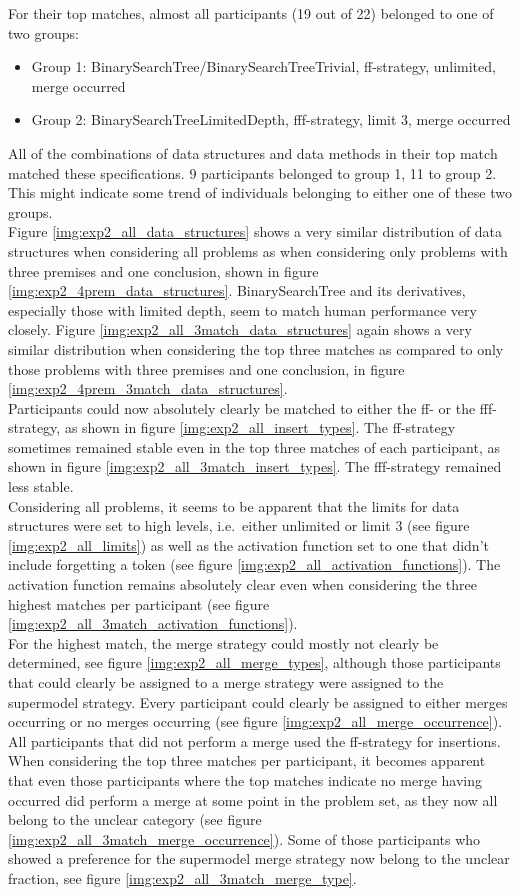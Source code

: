 \documentclass[hidelinks]{scrartcl}
\begin{document}
For their top matches, almost all participants (19 out of 22) belonged to one of two groups: 
\begin{itemize}
	\item Group 1: BinarySearchTree/BinarySearchTreeTrivial, ff-strategy, unlimited, merge occurred
	\item Group 2: BinarySearchTreeLimitedDepth, fff-strategy, limit 3, merge occurred
\end{itemize}
All of the combinations of data structures and data methods in their top match matched these specifications. 9 participants belonged to group 1, 11 to group 2. This might indicate some trend of individuals belonging to either one of these two groups. \\
Figure \ref{img:exp2_all_data_structures} shows a very similar distribution of data structures when considering all problems as when considering only problems with three premises and one conclusion, shown in figure \ref{img:exp2_4prem_data_structures}. BinarySearchTree and its derivatives, especially those with limited depth, seem to match human performance very closely. Figure \ref{img:exp2_all_3match_data_structures} again shows a very similar distribution when considering the top three matches as compared to only those problems with three premises and one conclusion, in figure \ref{img:exp2_4prem_3match_data_structures}. \\
Participants could now absolutely clearly be matched to either the ff- or the fff-strategy, as shown in figure \ref{img:exp2_all_insert_types}. The ff-strategy sometimes remained stable even in the top three matches of each participant, as shown in figure \ref{img:exp2_all_3match_insert_types}. The fff-strategy remained less stable. \\
Considering all problems, it seems to be apparent that the limits for data structures were set to high levels, i.e.\ either unlimited or limit 3 (see figure \ref{img:exp2_all_limits}) as well as the activation function set to one that didn't include forgetting a token (see figure \ref{img:exp2_all_activation_functions}). The activation function remains absolutely clear even when considering the three highest matches per participant (see figure \ref{img:exp2_all_3match_activation_functions}). \\
For the highest match, the merge strategy could mostly not clearly be determined, see figure \ref{img:exp2_all_merge_types}, although those participants that could clearly be assigned to a merge strategy were assigned to the supermodel strategy. Every participant could clearly be assigned to either merges occurring or no merges occurring (see figure \ref{img:exp2_all_merge_occurrence}). All participants that did not perform a merge used the ff-strategy for insertions. When considering the top three matches per participant, it becomes apparent that even those participants where the top matches indicate no merge having occurred did perform a merge at some point in the problem set, as they now all belong to the unclear category (see figure \ref{img:exp2_all_3match_merge_occurrence}). Some of those participants who showed a preference for the supermodel merge strategy now belong to the unclear fraction, see figure \ref{img:exp2_all_3match_merge_type}.\\
\end{document}

